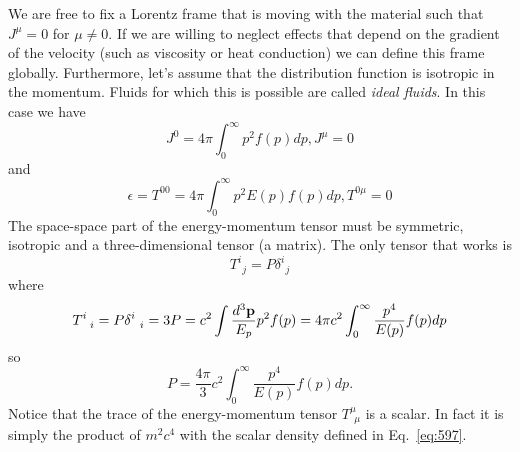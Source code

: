 We are free to fix a Lorentz frame that is moving with the material
such that $J^\mu=0$ for $\mu\neq 0$.  If we are willing to neglect
effects that depend on the gradient of the velocity (such as
viscosity or heat conduction) we can define this frame globally.  Furthermore, let's
assume that the distribution function is isotropic in the momentum.
Fluids for which this is possible are called {\em ideal fluids}.  In
this case we have
\begin{equation}
J^0 = 4\pi \int_0^\infty p^2 f(p) dp, J^\mu = 0 
\label{eq:606}
\end{equation}
and
\begin{equation}
\epsilon = T^{00} = 4\pi \int_0^\infty p^2 E(p) f(p) dp, T^{0\mu}=0
\label{eq:607}
\end{equation}
The space-space part of the energy-momentum tensor must be symmetric,
isotropic and a three-dimensional tensor (a matrix).  The only tensor
that works is
\begin{equation}
T^i_{~~j} = P \delta^i_{~~j}
\label{eq:608}
\end{equation}
where
\begin{equation}
T^i_{~~i} = P \delta^i_{~~i} = 3 P = c^2 \int \frac{d^3 {\bf p}}{E_p} p^2 f(p) = 
4 \pi c^2 \int_0^\infty \frac{p^4}{E(p)} f(p) dp
\label{eq:609}
\end{equation}
so
\begin{equation}
P = \frac{4 \pi}{3} c^2 \int_0^\infty \frac{p^4}{E(p)} f(p) dp.
\label{eq:610}
\end{equation}
Notice that the trace of the energy-momentum tensor $T^\mu_{~~\mu}$ is a
scalar.  In fact it is simply the product of $m^2 c^4$ with the scalar
density defined in Eq.~\ref{eq:597}.

